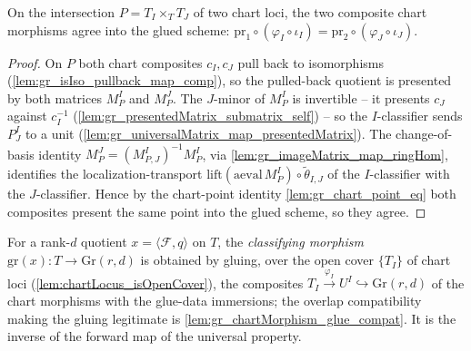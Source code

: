 \begin{lemma}\leanok
  \label{lem:gr_chartMorphism_glue_compat}
  On the intersection \(P = T_I \times_T T_J\) of two chart loci, the two composite chart
  morphisms agree into the glued scheme:
  \(\mathrm{pr}_1 \circ (\varphi_I \circ \iota_I) = \mathrm{pr}_2 \circ (\varphi_J \circ
  \iota_J)\).
\end{lemma}
\begin{proof}
  On \(P\) both chart composites \(c_I, c_J\) pull back to isomorphisms
  (\cref{lem:gr_isIso_pullback_map_comp}), so the pulled-back quotient is presented by both
  matrices \(M^I_P\) and \(M^J_P\). The \(J\)-minor of \(M^I_P\) is invertible -- it presents
  \(c_J\) against \(c_I^{-1}\) (\cref{lem:gr_presentedMatrix_submatrix_self}) -- so the
  \(I\)-classifier sends \(P^I_J\) to a unit
  (\cref{lem:gr_universalMatrix_map_presentedMatrix}). The change-of-basis identity
  \(M^J_P = (M^I_{P,J})^{-1} M^I_P\), via \cref{lem:gr_imageMatrix_map_ringHom}, identifies the
  localization-transport \(\mathrm{lift}(\mathrm{aeval}\,M^I_P)\circ\tilde\theta_{I,J}\) of the
  \(I\)-classifier with the \(J\)-classifier. Hence by the chart-point identity
  \cref{lem:gr_chart_point_eq} both composites present the same point into the glued scheme,
  so they agree.
\end{proof}

\begin{definition}\leanok
  \label{def:grPointOfRankQuotient}
  For a rank-\(d\) quotient \(x = \langle \mathcal{F}, q\rangle\) on \(T\), the
  \emph{classifying morphism} \(\mathrm{gr}(x) : T \to \mathrm{Gr}(r,d)\) is obtained by
  gluing, over the open cover \(\{T_I\}\) of chart loci (\cref{lem:chartLocus_isOpenCover}),
  the composites \(T_I \xrightarrow{\varphi_I} U^I \hookrightarrow \mathrm{Gr}(r,d)\) of the
  chart morphisms with the glue-data immersions; the overlap compatibility making the gluing
  legitimate is \cref{lem:gr_chartMorphism_glue_compat}. It is the inverse of the forward map
  of the universal property.
\end{definition}


